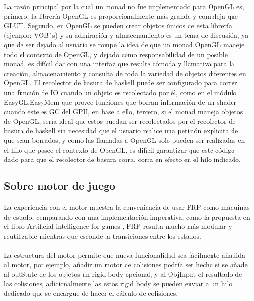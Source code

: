 \documentclass{standalone}
\begin{document}
\paragraph{}
La razón principal por la cual un monad no fue implementado para OpenGL es, primero, la librería OpenGL es proporcionalmente más grande y compleja que GLUT. Segundo, en OpenGL se pueden crear objetos únicos de esta librería (ejemplo: VOB´s) y su admiración y almacenamiento es un tema de discusión, ya que de ser dejado al usuario se rompe la idea de que un monad OpenGL maneje todo el contexto de OpenGL, y dejado como responsabilidad de un posible monad, es difícil dar con una interfaz que resulte cómoda y llamativa para la creación, almacenamiento y consulta de toda la variedad de objetos diferentes en OpenGL. El recolector de basura de haskell puede ser configurado para correr una función de IO cuando un objeto es recolectado por él, como en el módulo EasyGL.EasyMem que provee funciones que borran información de un shader cuando este es GC del GPU, en base a ello, tercero, si el monad maneja objetos de OpenGL, sería ideal que estos puedan ser recolectados por el recolector de basura de haskell sin necesidad que el usuario realice una petición explicita de que sean borrados, y como las llamadas a OpenGL solo pueden ser realizadas en el hilo que posee el contexto de OpenGL, es difícil garantizar que este código dado para que el recolector de basura corra, corra en efecto en el hilo indicado.

\subsection{Sobre motor de juego}

\paragraph{}
La experiencia con el motor muestra la conveniencia de usar FRP como máquinas de estado, comparando con una implementación imperativa, como la propuesta en el libro Artificial intelligence for games \cite{millington2016artificial}, FRP resulta mucho más modular y reutilizable mientras que esconde la transiciones entre los estados.

\paragraph{}
La estructura del motor permite que nueva funcionalidad  sea fácilmente añadida al motor, por ejemplo, añadir un motor de colisiones podría ser hecho si se añade al outState de los objetos un rigid body opcional, y al ObjInput el resultado de las colisiones, adicionalmente las estos rigid body se pueden enviar a un hilo dedicado que se encargue de hacer el cálculo de colisiones.
\end{document}

